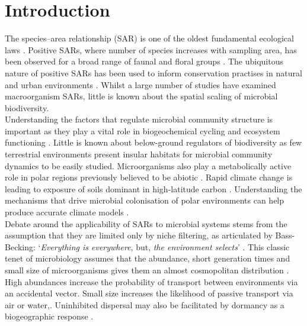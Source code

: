 \chapter{Introduction}

The species--area relationship (SAR) is one of the oldest fundamental ecological laws \cite{GooriahLeanaD2019Sedt}. Positive SARs, where number of species increases with sampling area, has been observed for a broad range of faunal \cite{ricklefs1999roles} \cite{lomolino1982species} \cite{eadie1986lakes} and floral groups \cite{zacharias1990species} \cite{price2011phylogenetic}. The ubiquitous nature of positive SARs has been used to inform conservation practises in natural \cite{haila2002conceptual} \cite{samson1980island} and urban environments \cite{davis1978urban}. Whilst a large number of studies have examined macroorganism SARs, little is known about the spatial scaling of microbial biodiversity. \\

{\texorpdfstring
\noindent UUnderstanding the factors that regulate microbial community structure is important as they play a vital role in biogeochemical cycling and ecosystem functioning \cite{griffiths2011bacterial}. Little is known about below-ground regulators of biodiversity as few terrestrial environments present insular habitats for microbial community dynamics to be easily studied. Microorganisms also play a metabolically active role in polar regions previously believed to be abiotic \cite{stibal2020glacial}. Rapid climate change is leading to exposure of soils dominant in high-latitude carbon \cite{bradley2017microbial}. Understanding the mechanisms that drive microbial colonisation of polar environments can help produce accurate climate models \cite{malard2018microbial}.} \\

\noindent Debate around the applicability of SARs to microbial systems stems from the assumption that they are limited only by niche filtering, as articulated by Bass-Becking: `\textit{Everything is everywhere}, but, \textit{the environment selects}' \cite{baas1934geobiologie}. This classic tenet of microbiology assumes that the abundance, short generation times and small size of microorganisms gives them an almost cosmopolitan distribution \cite{GreenJessica2006Ssom}. High abundances increase the probability of transport between environments via an accidental vector. Small size increases the likelihood of passive transport via air or water,\cite{GreenJessica2006Ssom}. Uninhibited dispersal may also be facilitated by dormancy as a biogeographic response \cite{LoceyKennethJ2010Stbw}. \\

